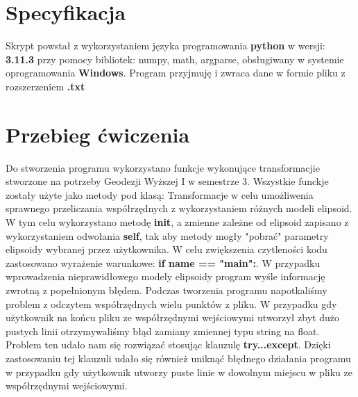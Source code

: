 \section{Specyfikacja}

\begin{flushleft}
	\hspace{1cm}Skrypt powstał z wykorzystaniem języka programowania \textbf{python} w wersji: \textbf{3.11.3} przy pomocy bibliotek: numpy, math, argparse, obsługiwany w systemie oprogramowania \textbf{Windows}. Program przyjmuję i zwraca dane w formie pliku z rozszerzeniem \textbf{.txt}
\end{flushleft}

\section{Przebieg ćwiczenia}

\begin{flushleft}
	\hspace{1cm}Do stworzenia programu wykorzystano funkcje wykonujące transformacjie stworzone na potrzeby Geodezji Wyższej I w semestrze 3. Wszystkie funckje zostały użyte jako metody pod klasą: Transformacje w celu umożliwenia sprawnego przeliczania współrzędnych z wykorzystaniem różnych modeli elipsoid. W tym celu wykorzystano metodę \textbf{init}, a zmienne zależne od elipsoid zapisano z wykorzystaniem odwołania \textbf{self}, tak aby metody mogły "pobrać" parametry elipsoidy wybranej przez użytkownika. W celu zwiększenia czytleności kodu zastosowano wyrażenie warunkowe: \textbf{if name == "main":}. W przypadku wprowadzenia nieprawidłowego modely elipsoidy program wyśle informację zwrotną z popełnionym błędem.
	\newline
	\hspace{1cm}Podczas tworzenia programu napotkaliśmy problem z odczytem współrzędnych wielu punktów z pliku. W przypadku gdy użytkownik na końcu pliku ze współrzędnymi wejściowymi utworzył zbyt dużo pustych linii otrzymywaliśmy błąd zamiany zmiennej typu string na float. Problem ten udało nam się rozwiązać stosując klauzulę \textbf{try...except}. Dzięki zastosowaniu tej klauzuli udało się również uniknąć błędnego działania programu w przypadku gdy użytkownik utworzy puste linie w dowolnym miejscu w pliku ze współrzędnymi wejściowymi.
\end{flushleft}